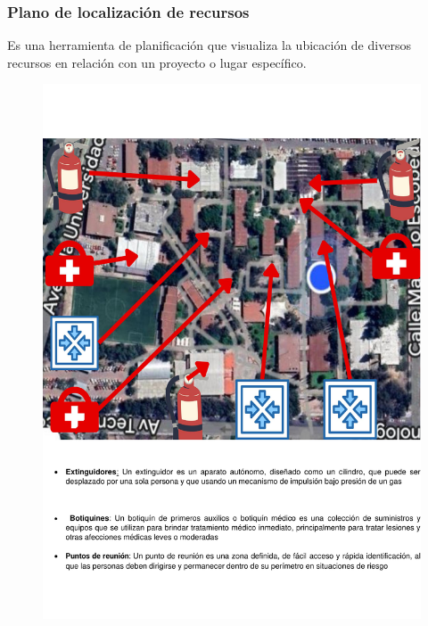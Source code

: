     \subsubsection{Plano de localización de recursos}
    Es una herramienta de planificación que visualiza la ubicación de diversos recursos en relación con un proyecto o lugar específico.\cite{E}
    \begin{figure}[H]
        \centering
        \includegraphics[scale=0.3]{9/Img/planoEstablecimiento.pdf}
        \label{fig:mapa-itq}
    \end{figure}

